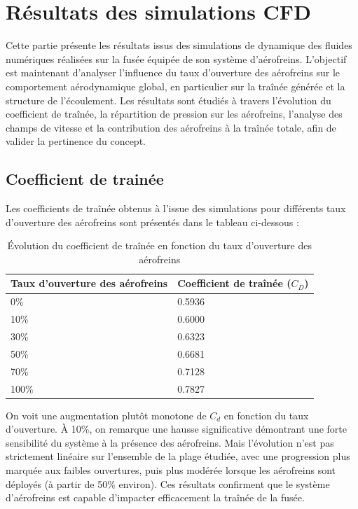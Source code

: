 \section{Résultats des simulations \acrshort{CFD}}

Cette partie présente les résultats issus des simulations de dynamique des fluides numériques réalisées sur la fusée équipée de
son système d’aérofreins. L’objectif est maintenant d’analyser l’influence du taux d’ouverture des aérofreins sur le
comportement aérodynamique global, en particulier sur la traînée générée et la structure de l’écoulement. Les résultats sont
étudiés à travers l’évolution du coefficient de traînée, la répartition de pression sur les aérofreins, l’analyse des champs de
vitesse et la contribution des aérofreins à la traînée totale, afin de valider la pertinence du concept.

\subsection{Coefficient de trainée}
\label{sec:cd}

Les coefficients de traînée obtenus à l’issue des simulations pour différents taux d’ouverture des aérofreins sont présentés
dans le tableau ci-dessous :

\begin{table}[H]
    \centering
    \begin{tabular}{|l|l|}
        \hline
        \textbf{Taux d'ouverture des aérofreins} & \textbf{Coefficient de traînée ($C_D$)} \\
        \hline
        \hline
        0\%  & 0.5936 \\
        \hline
        10\% & 0.6000 \\
        \hline
        30\% & 0.6323 \\
        \hline
        50\% & 0.6681 \\
        \hline
        70\% & 0.7128 \\
        \hline
        100\% & 0.7827 \\
        \hline
    \end{tabular}
    \caption{Évolution du coefficient de traînée en fonction du taux d'ouverture des aérofreins}
    \label{tab:Cd_vs_Aerofreins}
\end{table}

On voit une augmentation plutôt monotone de $C_d$ en fonction du taux d’ouverture. À 10\%, on remarque une hausse significative
démontrant une forte sensibilité du système à la présence des aérofreins. Mais l’évolution n’est pas strictement linéaire sur
l’ensemble de la plage étudiée, avec une progression plus marquée aux faibles ouvertures, puis plus modérée lorsque les
aérofreins sont déployés (à partir de 50\% environ). Ces résultats confirment que le système d’aérofreins est capable d’impacter
efficacement la traînée de la fusée. \\

